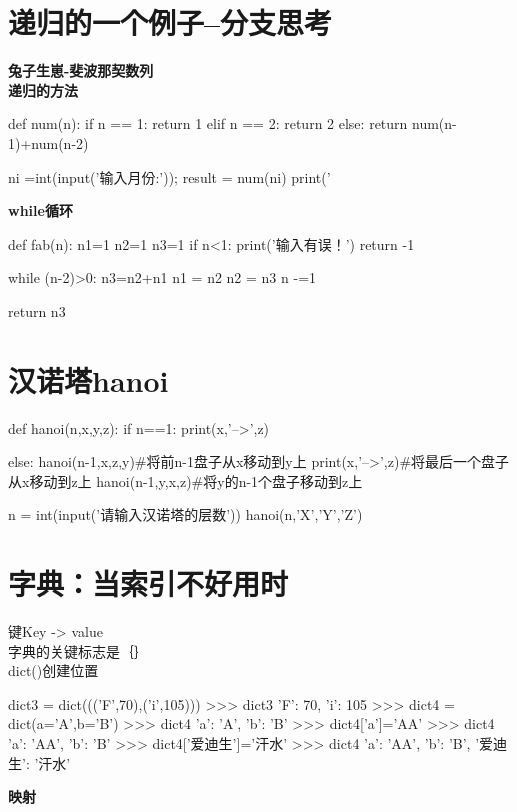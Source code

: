 \documentclass[a4paper,10pt]{ctexart}
\begin{document}
\section{递归的一个例子--分支思考}

\textbf{兔子生崽-斐波那契数列}\\
\textbf{递归的方法}
\begin{python}
def num(n):
    if n == 1:
        return 1
    elif n == 2:
        return 2
    else:
        return num(n-1)+num(n-2)

ni =int(input('输入月份:'));
result = num(ni)
print('%
\end{python}

\textbf{while循环}\\

\begin{python}
def fab(n):
    n1=1
    n2=1
    n3=1
    if n<1:
        print('输入有误！')
        return -1

    while (n-2)>0:
        n3=n2+n1
        n1 = n2
        n2 = n3
        n -=1

    return n3
\end{python}

\section{汉诺塔hanoi}

\begin{python}
def hanoi(n,x,y,z):
    if n==1:
        print(x,'-->',z)

    else:
        hanoi(n-1,x,z,y)#将前n-1盘子从x移动到y上
        print(x,'-->',z)#将最后一个盘子从x移动到z上
        hanoi(n-1,y,x,z)#将y的n-1个盘子移动到z上

n = int(input('请输入汉诺塔的层数'))
hanoi(n,'X','Y','Z')
\end{python}

\section{字典：当索引不好用时}

键Key -> value   \\
字典的关键标志是｛｝\\
dict()创建位置          \\

\begin{python}

dict3 = dict((('F',70),('i',105)))
>>> dict3
{'F': 70, 'i': 105}
>>> dict4 = dict(a='A',b='B')
>>> dict4
{'a': 'A', 'b': 'B'}
>>> dict4['a']='AA'
>>> dict4
{'a': 'AA', 'b': 'B'}
>>> dict4['爱迪生']='汗水'
>>> dict4
{'a': 'AA', 'b': 'B', '爱迪生': '汗水'}

\end{python}
\textbf{映射}
\end{document}
